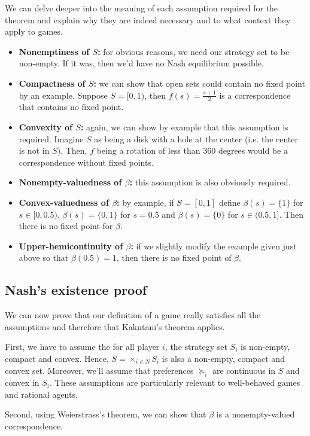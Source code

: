 \documentclass[12pt]{report}
\begin{document}
We can delve deeper into the meaning of each assumption required for the theorem and explain why they are indeed necessary and to what context they apply to games.\begin{itemize}
\item \textbf{Nonemptiness of $S$:} for obvious reasons, we need our strategy set to be non-empty. If it was, then we'd have no Nash equilibrium possible.
\item \textbf{Compactness of $S$:} we can show that open sets could contain no fixed point by an example. Suppose $S=[0,1)$, then $f(s) = \frac{s+1}{2}$ is a correspondence that contains no fixed point.
\item \textbf{Convexity of $S$:} again, we can show by example that this assumption is required. Imagine $S$ as being a disk with a hole at the center (i.e. the center is not in $S$). Then, $f$ being a rotation of less than 360 degrees would be a correspondence without fixed points.
\item \textbf{Nonempty-valuedness of $\beta$:} this assumption is also obviously required.
\item \textbf{Convex-valuedness of $\beta$:} by example, if $S = [0,1]$ define $\beta(s) = \{1\}$ for $s\in[0,0.5)$, $\beta(s) = \{0,1\}$ for $s = 0.5$ and $\beta(s) = \{0\}$ for $s\in (0.5,1]$. Then there is no fixed point for $\beta$.
\item \textbf{Upper-hemicontinuity of $\beta$:} if we slightly modify the example given just above so that $\beta(0.5) = 1$, then there is no fixed point of $\beta$.
\end{itemize}

\subsection{Nash's existence proof}

We can now prove that our definition of a game really satisfies all the assumptions and therefore that Kakutani's theorem applies.

First, we have to assume the for all player $i$, the strategy set $S_i$ is non-empty, compact and convex. Hence, $S = \times_{i\in N} S_i$ is also a non-empty, compact and convex set. Moreover, we'll assume that preferences $\succeq_i$ are continuous in $S$ and convex in $S_i$. These assumptions are particularly relevant to well-behaved games and rational agents.

Second, using Weierstrass's theorem, we can show that $\beta$ is a nonempty-valued correspondence.
\end{document}
